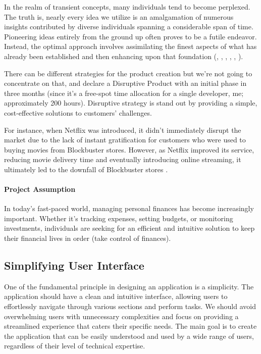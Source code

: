 
In the realm of transient concepts, many individuals tend to become perplexed. The truth is, nearly every idea we 
utilize is an amalgamation of numerous insights contributed by diverse individuals spanning a considerable span of 
time. Pioneering ideas entirely from the ground up often proves to be a futile endeavor. Instead, the optimal approach 
involves assimilating the finest aspects of what has already been established and then enhancing upon that foundation
(\cite{Azar22}, \cite{Page19}, \cite{Bara18}, \cite{Kleo12}, \cite{Thag12}, \cite{John11}).

There can be different strategies for the product creation \cite{Lomb17} but we're not going to concentrate on that,
and declare a Disruptive Product with an initial phase in three months (since it's a free-spot time allocation
for a single developer, me; approximately 200 hours). Disruptive strategy is stand out by providing a simple, 
cost-effective solutions to customers' challenges. 

For instance, when Netflix was introduced, it didn't immediately disrupt the market due to the lack of instant 
gratification for customers who were used to buying movies from Blockbuster stores. However, as Netflix 
improved its service, reducing movie delivery time and eventually introducing online streaming, it ultimately led 
to the downfall of Blockbuster stores \cite{Eby17}.

\paragraph{Project Assumption} In today's fast-paced world, managing personal finances has become increasingly 
important. Whether it's tracking expenses, setting budgets, or monitoring investments, individuals are seeking for an 
efficient and intuitive solution to keep their financial lives in order (take control of finances).


\subsection{Simplifying User Interface}

One of the fundamental principle in designing an application is a simplicity. The application should have a clean and 
intuitive interface, allowing users to effortlessly navigate through various sections and perform tasks. We should avoid 
overwhelming users with unnecessary complexities and focus on providing a streamlined experience that caters their 
specific needs. The main goal is to create the application that can be easily understood and used by a wide range of 
users, regardless of their level of technical expertise.

